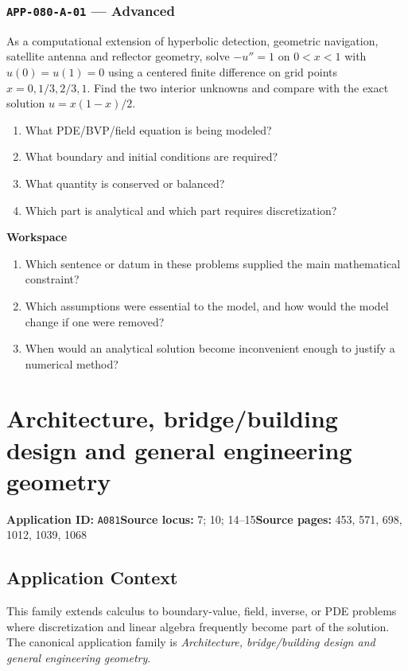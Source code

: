 \documentclass[11pt]{book}
\newcommand{\pid}[1]{\texttt{#1}}
\newcommand{\workspace}{\par\vspace{0.7in}\hrulefill\par\vspace{0.55in}\hrulefill\par}
\begin{document}
\subsection*{\pid{APP-080-A-01} — Advanced}
\begin{problembox}
As a computational extension of hyperbolic detection, geometric navigation, satellite antenna and reflector geometry, solve $-u''=1$ on $0<x<1$ with $u(0)=u(1)=0$ using a centered finite difference on grid points $x=0,1/3,2/3,1$. Find the two interior unknowns and compare with the exact solution $u=x(1-x)/2$.
\end{problembox}
\begin{promptbox}\begin{enumerate}
\item What PDE/BVP/field equation is being modeled?
\item What boundary and initial conditions are required?
\item What quantity is conserved or balanced?
\item Which part is analytical and which part requires discretization?
\end{enumerate}\end{promptbox}
\textbf{Workspace}\workspace
\begin{reflectionbox}\begin{enumerate}
\item Which sentence or datum in these problems supplied the main mathematical constraint?
\item Which assumptions were essential to the model, and how would the model change if one were removed?
\item When would an analytical solution become inconvenient enough to justify a numerical method?
\end{enumerate}\end{reflectionbox}
\chapter{Architecture, bridge/building design and general engineering geometry}\label{app:A081}
\textbf{Application ID:} \pid{A081}\quad \textbf{Source locus:} 7; 10; 14–15\quad \textbf{Source pages:} 453, 571, 698, 1012, 1039, 1068
\section*{Application Context}
This family extends calculus to boundary-value, field, inverse, or PDE problems where discretization and linear algebra frequently become part of the solution. The canonical application family is \emph{Architecture, bridge/building design and general engineering geometry}.
\end{document}
